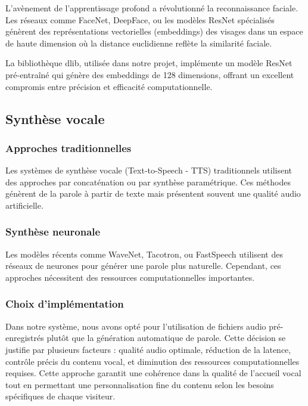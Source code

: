 \documentclass[12pt,a4paper]{article}
\begin{document}
L'avènement de l'apprentissage profond a révolutionné la reconnaissance faciale. Les réseaux comme FaceNet, DeepFace, ou les modèles ResNet spécialisés génèrent des représentations vectorielles (embeddings) des visages dans un espace de haute dimension où la distance euclidienne reflète la similarité faciale.

La bibliothèque dlib, utilisée dans notre projet, implémente un modèle ResNet pré-entraîné qui génère des embeddings de 128 dimensions, offrant un excellent compromis entre précision et efficacité computationnelle.

\subsection{Synthèse vocale}

\subsubsection{Approches traditionnelles}

Les systèmes de synthèse vocale (Text-to-Speech - TTS) traditionnels utilisent des approches par concaténation ou par synthèse paramétrique. Ces méthodes génèrent de la parole à partir de texte mais présentent souvent une qualité audio artificielle.

\subsubsection{Synthèse neuronale}

Les modèles récents comme WaveNet, Tacotron, ou FastSpeech utilisent des réseaux de neurones pour générer une parole plus naturelle. Cependant, ces approches nécessitent des ressources computationnelles importantes.

\subsubsection{Choix d'implémentation}

Dans notre système, nous avons opté pour l'utilisation de fichiers audio pré-enregistrés plutôt que la génération automatique de parole. Cette décision se justifie par plusieurs facteurs : qualité audio optimale, réduction de la latence, contrôle précis du contenu vocal, et diminution des ressources computationnelles requises. Cette approche garantit une cohérence dans la qualité de l'accueil vocal tout en permettant une personnalisation fine du contenu selon les besoins spécifiques de chaque visiteur.
\end{document}
